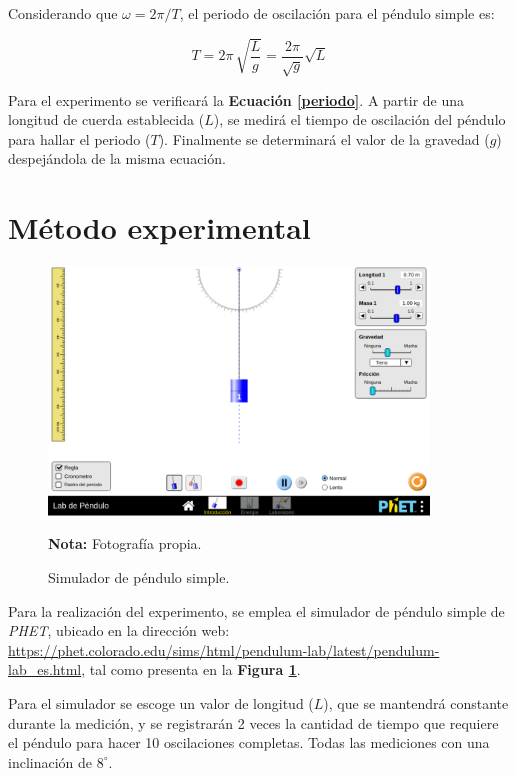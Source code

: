 \documentclass[letter,11pt]{article}
\newcommand{\source}[1]{\vspace{-11pt} \caption*{\small{\textbf{Nota:} {#1}}}}
\begin{document}
Considerando que $\omega = 2\pi / T$, el periodo de oscilación para el péndulo
simple es:

\begin{equation}
    T = 2\pi\, \sqrt{\frac{L}{g}} = \frac{2\pi}{\sqrt{g}} \sqrt{L}
\label{periodo}
\end{equation}
\vspace{0.10cm}

Para el experimento se verificará la \textbf{Ecuación \ref{periodo}}.
A partir de una longitud de cuerda establecida ($L$), se medirá el tiempo de
oscilación del péndulo para hallar el periodo ($T$). Finalmente se determinará
el valor de la gravedad ($g$) despejándola de la misma ecuación.

\section{Método experimental}

\begin{figure}
\centering
\includegraphics[width=0.90\textwidth]{resources/f2.eps}
\caption{Simulador de péndulo simple.}
\label{figura2}
\source{Fotografía propia.}
\end{figure}

Para la realización del experimento, se emplea el simulador de péndulo simple de
\emph{PHET}, ubicado en la dirección web: \url{
https://phet.colorado.edu/sims/html/pendulum-lab/latest/pendulum-lab_es.html},
tal como presenta en la \textbf{Figura \ref{figura2}}.

Para el simulador se escoge un valor de longitud ($L$), que se mantendrá
constante durante la medición, y se registrarán 2 veces la cantidad de tiempo
que requiere el péndulo para hacer 10 oscilaciones completas. Todas las
mediciones con una inclinación de $8^\circ$.
\end{document}
